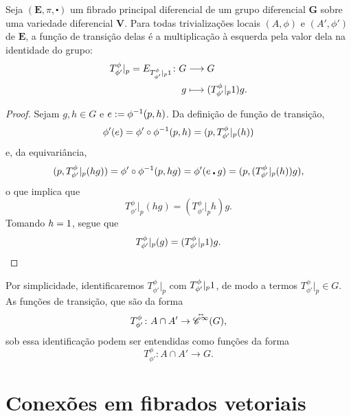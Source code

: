 \begin{proposition}
Seja $(\bm E,\pi,\centerdot)$ um fibrado principal diferencial de um grupo diferencial $\bm G$ sobre uma variedade diferencial $\bm V$. Para todas trivializações locais $(A,\phi)$ e $(A',\phi')$ de $\bm E$, a função de transição delas é a multiplicação à esquerda pela valor dela na identidade do grupo:
	\begin{align*}
	{T^\phi_{\phi'}|_p = E_{T^\phi_{\phi'}|_p 1}}\colon {G} &\longrightarrow {G} \\{g} &\longmapsto (T^\phi_{\phi'}|_p 1) g.
	\end{align*}
\end{proposition}
\begin{proof}
Sejam $g,h \in G$ e $e := \phi^{-1}(p,h)$. Da definição de função de transição,
	\begin{equation*}
	\phi'(e) = \phi' \circ \phi^{-1} (p,h) = (p,T^\phi_{\phi'}|_p(h))
	\end{equation*}
e, da equivariância,
	\begin{equation*}
	(p,T^\phi_{\phi'}|_p(hg)) = \phi' \circ \phi^{-1} (p,hg) = \phi'(e \centerdot g) = (p,(T^\phi_{\phi'}|_p(h))g),
	\end{equation*}
o que implica que
	\begin{equation*}
	T^\phi_{\phi'}|_p(hg) = (T^\phi_{\phi'}|_p h)g.
	\end{equation*}
Tomando $h=1$, segue que
	\begin{equation*}
	T^\phi_{\phi'}|_p(g) = (T^\phi_{\phi'}|_p 1)g.
	\end{equation*}
\end{proof}

Por simplicidade, identificaremos $T^\phi_{\phi'}|_p$ com $T^\phi_{\phi'}|_p 1$, de modo a termos $T^\phi_{\phi'}|_p \in G$. As funções de transição, que são da forma
	\begin{equation*}
	T^\phi_{\phi'}\colon A \cap A' \to \accentset{\leftrightarrow}{\mathscr{C}^\infty}(G),
	\end{equation*}
sob essa identificação podem ser entendidas como funções da forma
	\begin{equation*}
	T^\phi_{\phi'}\colon A \cap A' \to G.
	\end{equation*}








\section{Conexões em fibrados vetoriais}

